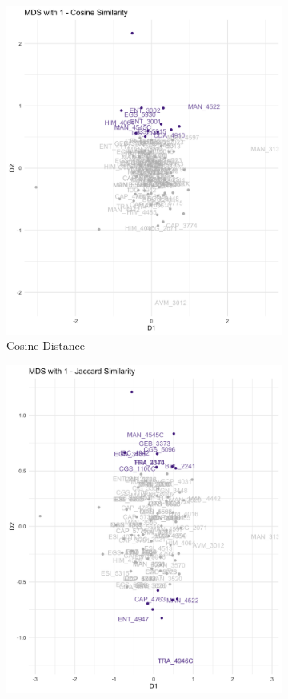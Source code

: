 \begin{figure}[H]
\centering
\begin{subfigure}{.5\textwidth}
  \centering
  \includegraphics[width=1\linewidth]{Content/images/cos_mds.png}
  \caption{Cosine Distance}
  \label{fig:cmds}
\end{subfigure}%
\begin{subfigure}{.5\textwidth}
  \centering
  \includegraphics[width=1\linewidth]{Content/images/jac_mds.png}

\end{subfigure}
\end{figure}
